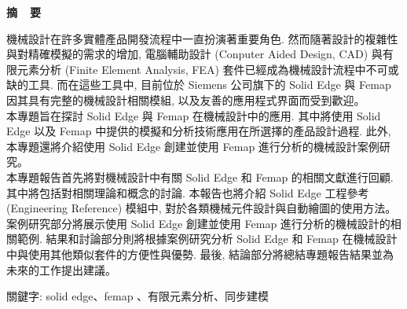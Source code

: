 \renewcommand{\baselinestretch}{1.5} %
\clearpage  %
\sectionef
{} %
\begin{center}
\LARGE\textbf{摘~~要}\\
\end{center}
\begin{flushleft}
\fontsize{14pt}{20pt}\sectionef\hspace{12pt}\quad 機械設計在許多實體產品開發流程中一直扮演著重要角色. 然而隨著設計的複雜性與對精確模擬的需求的增加, 電腦輔助設計 (Conputer Aided Design, CAD) 與有限元素分析 (Finite Element Analysis, FEA) 套件已經成為機械設計流程中不可或缺的工具. 而在這些工具中, 目前位於 Siemens 公司旗下的 Solid Edge 與 Femap 因其具有完整的機械設計相關模組, 以及友善的應用程式界面而受到歡迎。\\[12pt]
\fontsize{14pt}{20pt}\sectionef\hspace{12pt}\quad 本專題旨在探討 Solid Edge 與 Femap 在機械設計中的應用. 其中將使用 Solid Edge 以及 Femap 中提供的模擬和分析技術應用在所選擇的產品設計過程. 此外, 本專題還將介紹使用 Solid Edge 創建並使用 Femap 進行分析的機械設計案例研究。\\[12pt]
\fontsize{14pt}{20pt}\sectionef\hspace{12pt}\quad 本專題報告首先將對機械設計中有關 Solid Edge 和 Femap 的相關文獻進行回顧. 其中將包括對相關理論和概念的討論. 本報告也將介紹 Solid Edge 工程參考 (Engineering Reference) 模組中, 對於各類機械元件設計與自動繪圖的使用方法。\\[12pt]
\fontsize{14pt}{20pt}\sectionef\hspace{12pt}\quad 案例研究部分將展示使用 Solid Edge 創建並使用 Femap 進行分析的機械設計的相關範例.  結果和討論部分則將根據案例研究分析 Solid Edge 和 Femap 在機械設計中與使用其他類似套件的方便性與優勢. 最後, 結論部分將總結專題報告結果並為未來的工作提出建議。\\[12pt]

\end{flushleft}
\begin{center}
\fontsize{14pt}{20pt}\selectfont 關鍵字: solid edge、femap 、有限元素分析、同步建模
\end{center}
\newpage
\renewcommand{\baselinestretch}{1.5} %
